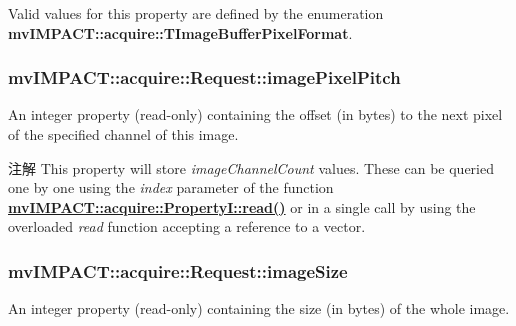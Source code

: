 Valid values for this property are defined by the enumeration {\bfseries mv\+I\+M\+P\+A\+C\+T\+::acquire\+::\+T\+Image\+Buffer\+Pixel\+Format}. \hypertarget{classmv_i_m_p_a_c_t_1_1acquire_1_1_request_a00bdcb0cbf23ca71092474d93a80fb0c}{
\subsubsection[{image\+Pixel\+Pitch}]{ mv\+I\+M\+P\+A\+C\+T\+::acquire\+::\+Request\+::image\+Pixel\+Pitch}}\label{classmv_i_m_p_a_c_t_1_1acquire_1_1_request_a00bdcb0cbf23ca71092474d93a80fb0c}


An integer property {\bfseries }(read-\/only) containing the offset (in bytes) to the next pixel of the specified channel of this image. 

\begin{DoxyNote}{注解}
This property will store {\itshape image\+Channel\+Count} values. These can be queried one by one using the {\itshape index} parameter of the function {\bfseries \hyperlink{classmv_i_m_p_a_c_t_1_1acquire_1_1_enum_property_i_a6f88e97f646978391226aaf82cd5955d}{mv\+I\+M\+P\+A\+C\+T\+::acquire\+::\+Property\+I\+::read()}} or in a single call by using the overloaded {\itshape read} function accepting a reference to a vector. 
\end{DoxyNote}
\hypertarget{classmv_i_m_p_a_c_t_1_1acquire_1_1_request_ac568c457aa474e73066bcc369a26cca1}{
\subsubsection[{image\+Size}]{ mv\+I\+M\+P\+A\+C\+T\+::acquire\+::\+Request\+::image\+Size}}\label{classmv_i_m_p_a_c_t_1_1acquire_1_1_request_ac568c457aa474e73066bcc369a26cca1}


An integer property {\bfseries }(read-\/only) containing the size (in bytes) of the whole image. 

